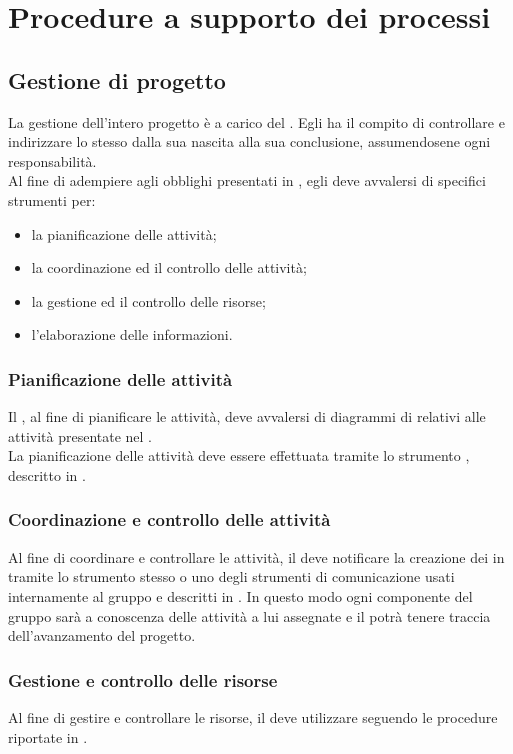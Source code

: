 \section{Procedure a supporto dei processi}
\subsection{Gestione di progetto}
La gestione dell'intero progetto è a carico del \Responsabile. Egli ha il compito di controllare e indirizzare lo stesso dalla sua nascita alla sua conclusione, assumendosene ogni responsabilità.\\
Al fine di adempiere agli obblighi presentati in , egli deve avvalersi di specifici strumenti per:
\begin{itemize}
	\item la pianificazione delle attività;
	\item la coordinazione ed il controllo delle attività;
	\item la gestione ed il controllo delle risorse;
	\item l'elaborazione delle informazioni.
\end{itemize}

\subsubsection{Pianificazione delle attività}
Il \Responsabile, al fine di pianificare le attività, deve avvalersi di diagrammi di  relativi alle attività presentate nel \PianoDiProgetto.\\
La pianificazione delle attività deve essere effettuata tramite lo strumento , descritto in .

\subsubsection{Coordinazione e controllo delle attività}
Al fine di coordinare e controllare le attività, il \Responsabile{} deve notificare la creazione dei  in  tramite lo strumento stesso o uno degli strumenti di comunicazione usati internamente al gruppo e descritti in . In questo modo ogni componente del gruppo sarà a conoscenza delle attività a lui assegnate e il \Responsabile{} potrà tenere traccia dell'avanzamento del progetto.

\subsubsection{Gestione e controllo delle risorse}
Al fine di gestire e controllare le risorse, il \Responsabile{} deve utilizzare  seguendo le procedure riportate in .


